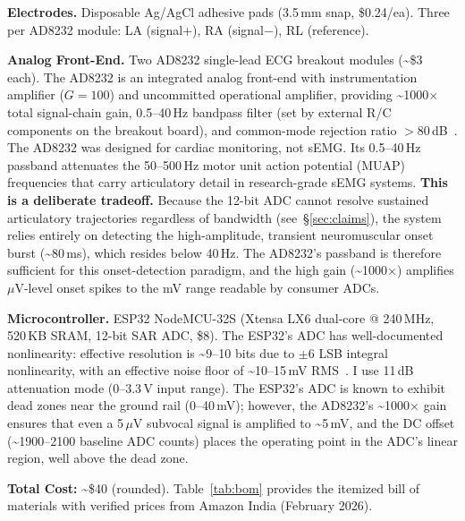 \documentclass{article}
\begin{document}
\textbf{Electrodes.} Disposable Ag/AgCl adhesive pads (3.5\,mm snap, \$0.24/ea). Three per AD8232 module: LA (signal+), RA (signal$-$), RL (reference).

\textbf{Analog Front-End.} Two AD8232 single-lead ECG breakout modules (\textasciitilde\$3 each). The AD8232 is an integrated analog front-end with instrumentation amplifier ($G=100$) and uncommitted operational amplifier, providing \textasciitilde1000$\times$ total signal-chain gain, 0.5--40\,Hz bandpass filter (set by external R/C components on the breakout board), and common-mode rejection ratio $>$80\,dB~\cite{ad8232}. The AD8232 was designed for cardiac monitoring, not sEMG. Its 0.5--40\,Hz passband attenuates the 50--500\,Hz motor unit action potential (MUAP) frequencies that carry articulatory detail in research-grade sEMG systems. \textbf{This is a deliberate tradeoff.} Because the 12-bit ADC cannot resolve sustained articulatory trajectories regardless of bandwidth (see~\S\ref{sec:claims}), the system relies entirely on detecting the high-amplitude, transient neuromuscular onset burst (\textasciitilde80\,ms), which resides below 40\,Hz. The AD8232's passband is therefore sufficient for this onset-detection paradigm, and the high gain (\textasciitilde1000$\times$) amplifies $\mu$V-level onset spikes to the mV range readable by consumer ADCs.

\textbf{Microcontroller.} ESP32 NodeMCU-32S (Xtensa LX6 dual-core @ 240\,MHz, 520\,KB SRAM, 12-bit SAR ADC, \$8). The ESP32's ADC has well-documented nonlinearity: effective resolution is \textasciitilde9--10 bits due to $\pm$6 LSB integral nonlinearity, with an effective noise floor of \textasciitilde10--15\,mV RMS~\cite{esp32adc}. I use 11\,dB attenuation mode (0--3.3\,V input range). The ESP32's ADC is known to exhibit dead zones near the ground rail (0--40\,mV); however, the AD8232's \textasciitilde1000$\times$ gain ensures that even a 5\,$\mu$V subvocal signal is amplified to \textasciitilde5\,mV, and the DC offset (\textasciitilde1900--2100 baseline ADC counts) places the operating point in the ADC's linear region, well above the dead zone.

\textbf{Total Cost:} \textasciitilde\$40 (rounded). Table~\ref{tab:bom} provides the itemized bill of materials with verified prices from Amazon India (February 2026).
\end{document}
